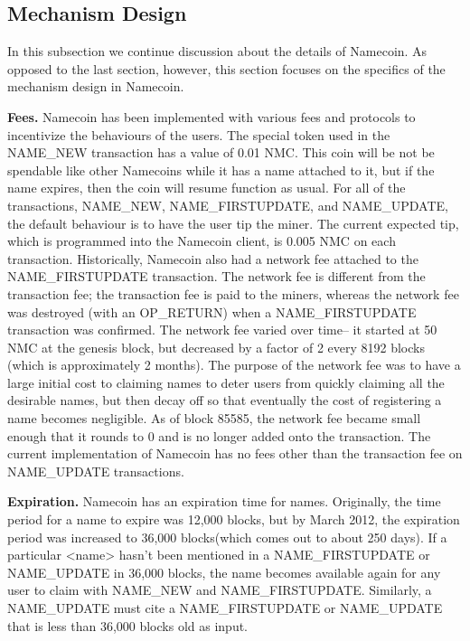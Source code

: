\subsection{Mechanism Design}

In this subsection we continue discussion about the details of Namecoin. As opposed to the last section, however, this section focuses on the specifics of the mechanism design in Namecoin. 

{\bf Fees.}
Namecoin has been implemented with various fees and protocols to incentivize the behaviours of the users. The special token used in the NAME\_NEW transaction has a value of 0.01 NMC. This coin will be not be spendable like other Namecoins while it has a name attached to it, but if the name expires, then the coin will resume function as usual. For all of the transactions, NAME\_NEW, NAME\_FIRSTUPDATE, and NAME\_UPDATE, the default behaviour is to have the user tip the miner. The current expected tip, which is programmed into the Namecoin client, is 0.005 NMC on each transaction. Historically, Namecoin also had a network fee attached to the NAME\_FIRSTUPDATE transaction. The network fee is different from the transaction fee; the transaction fee is paid to the miners, whereas the network fee was destroyed (with an OP\_RETURN) when a NAME\_FIRSTUPDATE transaction was confirmed. The network fee varied over time-- it started at 50 NMC at the genesis block, but decreased by a factor of 2 every 8192 blocks (which is approximately 2 months). The purpose of the network fee was to have a large initial cost to claiming names to deter users from quickly claiming all the desirable names, but then decay off so that eventually the cost of registering a name becomes negligible. As of block 85585, the network fee became small enough that it rounds to 0 and is no longer added onto the transaction. The current implementation of Namecoin has no fees other than the transaction fee on NAME\_UPDATE transactions.

{\bf Expiration.}
Namecoin has an expiration time for names. Originally, the time period for a name to expire was 12,000 blocks, but by March 2012, the expiration period was increased to 36,000 blocks(which comes out to about 250 days). If a particular <name> hasn't been mentioned in a NAME\_FIRSTUPDATE or NAME\_UPDATE in 36,000 blocks, the name becomes available again for any user to claim with NAME\_NEW and NAME\_FIRSTUPDATE. Similarly, a NAME\_UPDATE must cite a NAME\_FIRSTUPDATE or NAME\_UPDATE that is less than 36,000 blocks old as input. 
 
